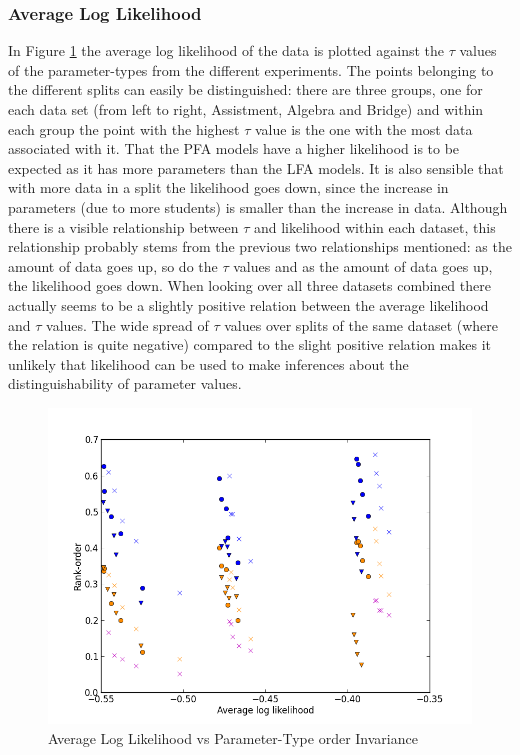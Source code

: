 \documentclass{scrartcl}
\begin{document}

\subsubsection{Average Log Likelihood}
In Figure \ref{fig:likely} the average log likelihood of the data is plotted against the $\tau$ values of the parameter-types from the different experiments. The points belonging to the different splits can easily be distinguished: there are three groups, one for each data set (from left to right, Assistment, Algebra and Bridge) and within each group the point with the highest $\tau$ value is the one with the most data associated with it. That the PFA models have a higher likelihood is to be expected as it has more parameters than the LFA models. It is also sensible that with more data in a split the likelihood goes down, since the increase in parameters (due to more students) is smaller than the increase in data. Although there is a visible relationship between $\tau$ and likelihood within each dataset, this relationship probably stems from the previous two relationships mentioned: as the amount of data goes up, so do the $\tau$ values and as the amount of data goes up, the likelihood goes down. When looking over all three datasets combined there actually seems to be a slightly positive relation between the average likelihood and $\tau$ values. The wide spread of $\tau$ values over splits of the same dataset (where the relation is quite negative) compared to the slight positive relation makes it unlikely that likelihood can be used to make inferences about the distinguishability of parameter values.
\begin{figure}[h]
\centering
\includegraphics[width=140mm]{images/alllikely.png}
\caption{Average Log Likelihood vs Parameter-Type order Invariance}
\label{fig:likely}
\end{figure}
\end{document}
